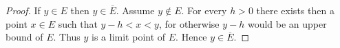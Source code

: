 \begin{proof}
If $y\in E$ then $y\in\overline{E}$. Assume $y\notin E$. For every $h>0$ there exists then a point $x\in E$ such that $y-h<x<y$, for otherwise $y-h$ would be an upper bound of $E$. Thus $y$ is a limit point of $E$. Hence $y\in\overline{E}$.
\end{proof}
\pagebreak


\begin{comment}
\item A point $x$ is an \vocab{exterior point} of $A$ if it is an interior point of $A^c$.
\item $E$ is compact if it is a bounded closed set.

\begin{proposition}
The set of exterior points, $(A^c)^\circ$ is the same as $(\bar{A})^c$.
\end{proposition}

\begin{proof}
\begin{align*}
x \in (A^c)^\circ 
&\iff \exists \epsilon>0 \text{ such that } B(x,\epsilon) \subset A^c \\
&\iff B(x,\epsilon) \cap A = \emptyset \\
&\iff x \notin A \text{ and } B_0(x,\epsilon) \cap A=\emptyset \\
&\iff x \notin A \cup A^\prime = \bar A \\
&\iff x \in (\bar A^c)
\end{align*}
\end{proof}

\begin{proposition}
\begin{enumerate}[label=(\roman*)]
\item $A^\prime$ is closed.
\item $\bar{A}$ is closed, i.e. $\bar{\bar{A}}=\bar{A}$
\end{enumerate}
\end{proposition}

\begin{proof} \
\begin{enumerate}[label=(\roman*)]
\item In order to show that $A^\prime$ is closed, we need to show that if $x$ is a limit point of $A^\prime$, then $x\in A^\prime$, i.e. $x$ is a limit point of $A$.

So we need to show that limit points of $A^\prime$ are always limit points of $A$: 
Let $x$ be a limit point of $A^\prime$, then for all $\epsilon>0$, $B_0(x,\epsilon/2)$ intersects with $A^\prime$ and we may pick $y \in B_0(x,\epsilon/2)\cap A^\prime$


\end{comment}
